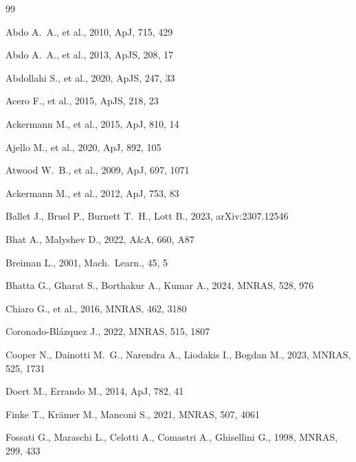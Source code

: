 \documentclass[fleqn,12pt]{article}
\begin{document}

\begin{thebibliography}{99}

Abdo A.~A., et al., 2010, ApJ, 715, 429

Abdo A.~A., et al., 2013, ApJS, 208, 17

Abdollahi S., et al., 2020, ApJS, 247, 33

Acero F., et al., 2015, ApJS, 218, 23

Ackermann M., et al., 2015, ApJ, 810, 14

Ajello M., et al., 2020, ApJ, 892, 105

Atwood W.~B., et al., 2009, ApJ, 697, 1071

Ackermann M., et al., 2012, ApJ, 753, 83

Ballet J., Bruel P., Burnett T.~H., Lott B., 2023, arXiv:2307.12546

Bhat A., Malyshev D., 2022, A\&A, 660, A87

Breiman L., 2001, Mach.\ Learn., 45, 5

Bhatta G., Gharat S., Borthakur A., Kumar A., 2024, MNRAS, 528, 976

Chiaro G., et al., 2016, MNRAS, 462, 3180

Coronado-Bl\'{a}zquez J., 2022, MNRAS, 515, 1807

Cooper N., Dainotti M.~G., Narendra A., Liodakis I., Bogdan M.,
  2023, MNRAS, 525, 1731

Doert M., Errando M., 2014, ApJ, 782, 41

Finke T., Kr\"{a}mer M., Manconi S., 2021, MNRAS, 507, 4061

Fossati G., Maraschi L., Celotti A., Comastri A., Ghisellini G.,
  1998, MNRAS, 299, 433


\end{thebibliography}
\end{document}
